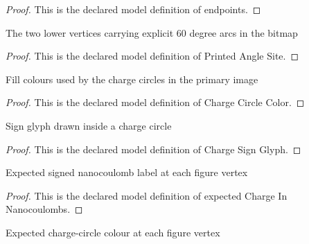 \begin{proof}
  This is the declared model definition of endpoints.
\end{proof}
\begin{definition}
  \label{def:physics:phyx-mini-0894:phyxminiproblems-problemphyxmini0894-printedanglesite}
  The two lower vertices carrying explicit 60 degree arcs in the bitmap
\end{definition}
\begin{proof}
  This is the declared model definition of Printed Angle Site.
\end{proof}
\begin{definition}
  \label{def:physics:phyx-mini-0894:phyxminiproblems-problemphyxmini0894-chargecirclecolor}
  Fill colours used by the charge circles in the primary image
\end{definition}
\begin{proof}
  This is the declared model definition of Charge Circle Color.
\end{proof}
\begin{definition}
  \label{def:physics:phyx-mini-0894:phyxminiproblems-problemphyxmini0894-chargesignglyph}
  Sign glyph drawn inside a charge circle
\end{definition}
\begin{proof}
  This is the declared model definition of Charge Sign Glyph.
\end{proof}
\begin{definition}
  \label{def:physics:phyx-mini-0894:phyxminiproblems-problemphyxmini0894-expectedchargeinnanocoulombs}
  Expected signed nanocoulomb label at each figure vertex
\end{definition}
\begin{proof}
  This is the declared model definition of expected Charge In Nanocoulombs.
\end{proof}
\begin{definition}
  \label{def:physics:phyx-mini-0894:phyxminiproblems-problemphyxmini0894-expectedchargecolor}
  Expected charge-circle colour at each figure vertex
\end{definition}
